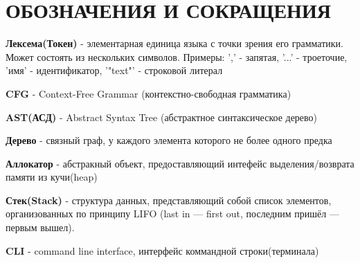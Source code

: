 
\chapter*{ОБОЗНАЧЕНИЯ И СОКРАЩЕНИЯ}             %

\textbf{Лексема(Токен)} - элементарная единица языка с точки зрения его грамматики. Может состоять из нескольких символов.
Примеры: ',' - запятая, '...' - троеточие, 'имя' - идентификатор, '"text"' - строковой литерал

\textbf{CFG} - Context-Free Grammar (контекстно-свободная грамматика)

\textbf{AST(АСД)} - Abstract Syntax Tree (абстрактное синтаксическое дерево)

\textbf{Дерево} - связный граф, у каждого элемента которого не более одного предка

\textbf{Аллокатор} - абстракный объект, предоставляющий интефейс выделения/возврата памяти из кучи(heap)

\textbf{Стек(Stack)} -  структура данных, представляющий собой список элементов, организованных по принципу LIFO (last in — first out, последним пришёл — первым вышел).

\textbf{CLI} -  command line interface, интерфейс коммандной строки(терминала)